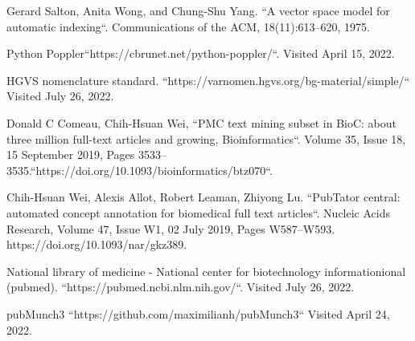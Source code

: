 \documentclass[../DoAn.tex]{subfiles}
\begin{document}
\cite{salton1975vector} Gerard Salton, Anita Wong, and Chung-Shu Yang. ``A vector space model for automatic indexing``. Communications of the ACM, 18(11):613–620, 1975.

\cite{poppler} Python Poppler``https://cbrunet.net/python-poppler/``. Visited April 15, 2022.

\cite{HGVS} HGVS nomenclature standard. ``https://varnomen.hgvs.org/bg-material/simple/`` Visited July 26, 2022.

\cite{PMCtextmining} Donald C Comeau, Chih-Hsuan Wei, ``PMC text mining subset in BioC: about three million full-text articles and growing, Bioinformatics``. Volume 35, Issue 18, 15 September 2019, Pages 3533–3535.``https://doi.org/10.1093/bioinformatics/btz070``.

\cite{PubTator} Chih-Hsuan Wei, Alexis Allot, Robert Leaman, Zhiyong Lu. ``PubTator central: automated concept annotation for biomedical full text articles``. Nucleic Acids Research, Volume 47, Issue W1, 02 July 2019, Pages W587–W593.
 https://doi.org/10.1093/nar/gkz389. 




\cite{pubmed} National library of medicine - National center for biotechnology informationional (pubmed). ``https://pubmed.ncbi.nlm.nih.gov/``. Visited July 26, 2022.

\cite{pubMunch} pubMunch3 ``https://github.com/maximilianh/pubMunch3`` Visited April 24, 2022.
\end{document}
